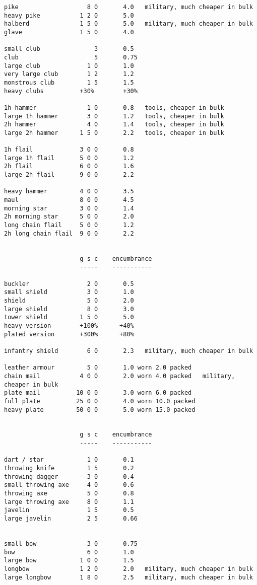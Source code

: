 \begin{verbatim}
pike                   8 0       4.0   military, much cheaper in bulk
heavy pike           1 2 0       5.0
halberd              1 5 0       5.0   military, much cheaper in bulk
glave                1 5 0       4.0

small club               3       0.5
club                     5       0.75
large club             1 0       1.0
very large club        1 2       1.2
monstrous club         1 5       1.5
heavy clubs          +30%        +30%

1h hammer              1 0       0.8   tools, cheaper in bulk
large 1h hammer        3 0       1.2   tools, cheaper in bulk
2h hammer              4 0       1.4   tools, cheaper in bulk
large 2h hammer      1 5 0       2.2   tools, cheaper in bulk

1h flail             3 0 0       0.8
large 1h flail       5 0 0       1.2
2h flail             6 0 0       1.6
large 2h flail       9 0 0       2.2

heavy hammer         4 0 0       3.5
maul                 8 0 0       4.5
morning star         3 0 0       1.4
2h morning star      5 0 0       2.0
long chain flail     5 0 0       1.2
2h long chain flail  9 0 0       2.2


                     g s c    encumbrance
                     -----    -----------

buckler                2 0       0.5
small shield           3 0       1.0
shield                 5 0       2.0
large shield           8 0       3.0
tower shield         1 5 0       5.0
heavy version        +100%      +40%
plated version       +300%      +80%

infantry shield        6 0       2.3   military, much cheaper in bulk

leather armour         5 0       1.0 worn 2.0 packed
chain mail           4 0 0       2.0 worn 4.0 packed   military, cheaper in bulk
plate mail          10 0 0       3.0 worn 6.0 packed
full plate          25 0 0       4.0 worn 10.0 packed
heavy plate         50 0 0       5.0 worn 15.0 packed


                     g s c    encumbrance
                     -----    -----------

dart / star            1 0       0.1
throwing knife         1 5       0.2
throwing dagger        3 0       0.4
small throwing axe     4 0       0.6
throwing axe           5 0       0.8
large throwing axe     8 0       1.1
javelin                1 5       0.5
large javelin          2 5       0.66


small bow              3 0       0.75
bow                    6 0       1.0
large bow            1 0 0       1.5
longbow              1 2 0       2.0   military, much cheaper in bulk
large longbow        1 8 0       2.5   military, much cheaper in bulk


\end{verbatim}
